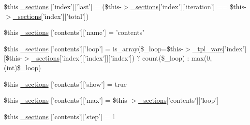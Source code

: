 \begin{DoxyCompactItemize}
\item 
\$this \hyperlink{media_234d6fa4bfd5eef6424a9ddc74a166350_2_06_06-19_05_06_06-1910644431_05basicindex_8tpl_8php_a21655935ac4f76e2eb1b4fc8f39a5f21}{\-\_\-sections} \mbox{[}'index'\mbox{]}\mbox{[}'last'\mbox{]} = (\$this-\/$>$\hyperlink{_06_06127_05_06_0612781687_05pkgelementindex_8tpl_8php_a9e3d26b39edfe29c3f29b8035ef33828}{\-\_\-sections}\mbox{[}'index'\mbox{]}\mbox{[}'iteration'\mbox{]} == \$this-\/$>$\hyperlink{_06_06127_05_06_0612781687_05pkgelementindex_8tpl_8php_a9e3d26b39edfe29c3f29b8035ef33828}{\-\_\-sections}\mbox{[}'index'\mbox{]}\mbox{[}'total'\mbox{]})
\item 
\$this \hyperlink{media_234d6fa4bfd5eef6424a9ddc74a166350_2_06_06-19_05_06_06-1910644431_05basicindex_8tpl_8php_a3589d4df5cd7702f429822ac946d6783}{\-\_\-sections} \mbox{[}'contents'\mbox{]}\mbox{[}'name'\mbox{]} = 'contents'
\item 
\$this \hyperlink{media_234d6fa4bfd5eef6424a9ddc74a166350_2_06_06-19_05_06_06-1910644431_05basicindex_8tpl_8php_ae8c055e6fcc9126501d6e4442fb1e53a}{\-\_\-sections} \mbox{[}'contents'\mbox{]}\mbox{[}'loop'\mbox{]} = is\-\_\-array(\$\-\_\-loop=\$this-\/$>$\hyperlink{_06_06127_05_06_0612781687_05pkgelementindex_8tpl_8php_a4a4846d8e68d455590131a05697f67a3}{\-\_\-tpl\-\_\-vars}\mbox{[}'index'\mbox{]}\mbox{[}\$this-\/$>$\hyperlink{_06_06127_05_06_0612781687_05pkgelementindex_8tpl_8php_a9e3d26b39edfe29c3f29b8035ef33828}{\-\_\-sections}\mbox{[}'index'\mbox{]}\mbox{[}'index'\mbox{]}\mbox{]}\mbox{[}'index'\mbox{]}) ? count(\$\-\_\-loop) \-: max(0, (int)\$\-\_\-loop)
\item 
\$this \hyperlink{media_234d6fa4bfd5eef6424a9ddc74a166350_2_06_06-19_05_06_06-1910644431_05basicindex_8tpl_8php_a014a817ed19b339bd5ee1357b80ca8c7}{\-\_\-sections} \mbox{[}'contents'\mbox{]}\mbox{[}'show'\mbox{]} = true
\item 
\$this \hyperlink{media_234d6fa4bfd5eef6424a9ddc74a166350_2_06_06-19_05_06_06-1910644431_05basicindex_8tpl_8php_a199328578f46d74cad5394c8b3eef3df}{\-\_\-sections} \mbox{[}'contents'\mbox{]}\mbox{[}'max'\mbox{]} = \$this-\/$>$\hyperlink{_06_06127_05_06_0612781687_05pkgelementindex_8tpl_8php_a9e3d26b39edfe29c3f29b8035ef33828}{\-\_\-sections}\mbox{[}'contents'\mbox{]}\mbox{[}'loop'\mbox{]}
\item 
\$this \hyperlink{media_234d6fa4bfd5eef6424a9ddc74a166350_2_06_06-19_05_06_06-1910644431_05basicindex_8tpl_8php_aed58e295ff6fc74cbb3029d59396c219}{\-\_\-sections} \mbox{[}'contents'\mbox{]}\mbox{[}'step'\mbox{]} = 1
\item 

\end{DoxyCompactItemize}
